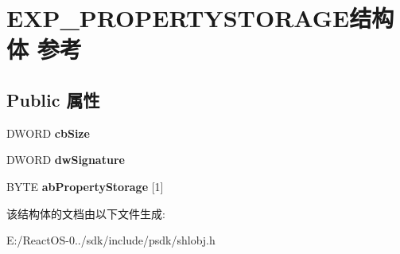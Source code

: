 \hypertarget{struct_e_x_p___p_r_o_p_e_r_t_y_s_t_o_r_a_g_e}{}\section{E\+X\+P\+\_\+\+P\+R\+O\+P\+E\+R\+T\+Y\+S\+T\+O\+R\+A\+G\+E结构体 参考}
\label{struct_e_x_p___p_r_o_p_e_r_t_y_s_t_o_r_a_g_e}
\subsection*{Public 属性}
\begin{DoxyCompactItemize}
\item 
\mbox{\label{struct_e_x_p___p_r_o_p_e_r_t_y_s_t_o_r_a_g_e_a8dc9fc4c6bd76556a2d7dcfe8e4ca448}} 
D\+W\+O\+RD {\bfseries cb\+Size}
\item 
\mbox{\label{struct_e_x_p___p_r_o_p_e_r_t_y_s_t_o_r_a_g_e_a0d1c55f430f852467839eb8acaafef9f}} 
D\+W\+O\+RD {\bfseries dw\+Signature}
\item 
\mbox{\label{struct_e_x_p___p_r_o_p_e_r_t_y_s_t_o_r_a_g_e_aa087864cba29b7f2c69c3fd6c69d501d}} 
B\+Y\+TE {\bfseries ab\+Property\+Storage} \mbox{[}1\mbox{]}
\end{DoxyCompactItemize}


该结构体的文档由以下文件生成\+:\begin{DoxyCompactItemize}
\item 
E\+:/\+React\+O\+S-\/0../sdk/include/psdk/shlobj.\+h\end{DoxyCompactItemize}
